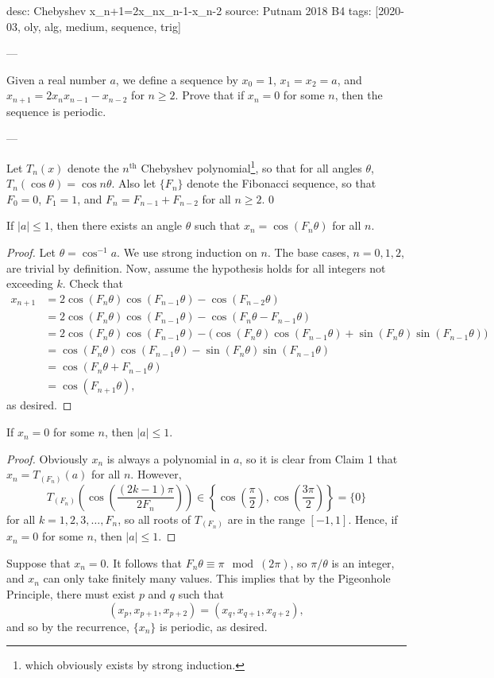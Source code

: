 desc: Chebyshev x_{n+1}=2x_nx_{n-1}-x_{n-2}
source: Putnam 2018 B4
tags: [2020-03, oly, alg, medium, sequence, trig]

---

Given a real number $a$, we define a sequence by $x_0=1$, $x_1=x_2=a$, and $x_{n+1}=2x_nx_{n-1}-x_{n-2}$ for $n\ge 2$. Prove that if $x_n=0$ for some $n$, then the sequence is periodic.

---

Let $T_n(x)$ denote the $n^\text{th}$ Chebyshev polynomial\footnote{which obviously exists by strong induction.}, so that for all angles $\theta$, $T_n(\cos\theta)=\cos n\theta$. Also let $\{F_n\}$ denote the Fibonacci sequence, so that $F_0=0$, $F_1=1$, and $F_n=F_{n-1}+F_{n-2}$ for all $n\ge 2$.
\setcounter{claim}0
\begin{claim}
If $|a|\le 1$, then there exists an angle $\theta$ such that $x_n=\cos(F_n\theta)$ for all $n$.
\end{claim}
\begin{proof}
Let $\theta=\cos^{-1} a$. We use strong induction on $n$. The base cases, $n=0,1,2$, are trivial by definition. Now, assume the hypothesis holds for all integers not exceeding $k$. Check that
\begin{align*}
x_{n+1}&=2\cos(F_n\theta)\cos(F_{n-1}\theta)-\cos(F_{n-2}\theta)\\
&=2\cos(F_n\theta)\cos(F_{n-1}\theta)-\cos(F_n\theta-F_{n-1}\theta)\\
&=2\cos(F_n\theta)\cos(F_{n-1}\theta)-\big(\cos(F_n\theta)\cos(F_{n-1}\theta)+\sin(F_n\theta)\sin(F_{n-1}\theta)\big)\\
&=\cos(F_n\theta)\cos(F_{n-1}\theta)-\sin(F_n\theta)\sin(F_{n-1}\theta)\\
&=\cos(F_n\theta+F_{n-1}\theta)\\
&=\cos(F_{n+1}\theta),
\end{align*}
as desired.
\end{proof}
\begin{claim}
If $x_n=0$ for some $n$, then $|a|\le 1$.
\end{claim}
\begin{proof}
    Obviously $x_n$ is always a polynomial in $a$, so it is clear from Claim 1 that $x_n=T_{(F_n)}(a)$ for all $n$. However, \[T_{(F_n)}\left(\cos\left(\frac{(2k-1)\pi}{2F_n}\right)\right)\in\left\{\cos\left(\frac{\pi}2\right),\cos\left(\frac{3\pi}2\right)\right\}=\{0\}\]
for all $k=1,2,3,\ldots,F_n$, so all roots of $T_{(F_n)}$ are in the range $[-1,1]$. Hence, if $x_n=0$ for some $n$, then $|a|\le 1$.
\end{proof}

Suppose that $x_n=0$. It follows that $F_n\theta\equiv \pi\mod(2\pi)$, so $\pi/\theta$ is an integer, and $x_n$ can only take finitely many values. This implies that by the Pigeonhole Principle, there must exist $p$ and $q$ such that \[(x_p,x_{p+1},x_{p+2})=(x_q,x_{q+1},x_{q+2}),\]
and so by the recurrence, $\{x_n\}$ is periodic, as desired.
